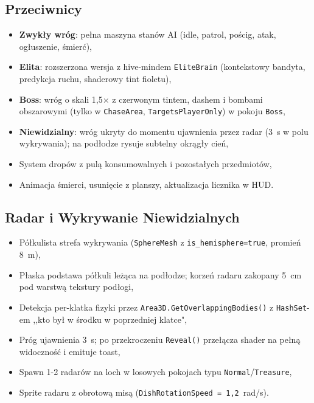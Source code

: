 \subsection{Przeciwnicy}
\begin{itemize}
    \item \textbf{Zwykły wróg}: pełna maszyna stanów AI (idle, patrol, pościg, atak, ogłuszenie, śmierć),
    \item \textbf{Elita}: rozszerzona wersja z hive-mindem \texttt{EliteBrain} (kontekstowy bandyta, predykcja ruchu, shaderowy tint fioletu),
    \item \textbf{Boss}: wróg o skali 1,5$\times$ z czerwonym tintem, dashem i bombami obszarowymi (tylko w \texttt{ChaseArea}, \texttt{TargetsPlayerOnly}) w pokoju \texttt{Boss},
    \item \textbf{Niewidzialny}: wróg ukryty do momentu ujawnienia przez radar (3~s w polu wykrywania); na podłodze rysuje subtelny okrągły cień,
    \item System dropów z pulą konsumowalnych i pozostałych przedmiotów,
    \item Animacja śmierci, usunięcie z planszy, aktualizacja licznika w HUD.
\end{itemize}

\subsection{Radar i Wykrywanie Niewidzialnych}
\begin{itemize}
    \item Półkulista strefa wykrywania (\texttt{SphereMesh} z \texttt{is\_hemisphere=true}, promień 8~m),
    \item Płaska podstawa półkuli leżąca na podłodze; korzeń radaru zakopany 5~cm pod warstwą tekstury podłogi,
    \item Detekcja per-klatka fizyki przez \texttt{Area3D.GetOverlappingBodies()} z \texttt{HashSet}-em ,,kto był w środku w poprzedniej klatce",
    \item Próg ujawnienia 3~s; po przekroczeniu \texttt{Reveal()} przełącza shader na pełną widoczność i emituje toast,
    \item Spawn 1-2 radarów na loch w losowych pokojach typu \texttt{Normal}/\texttt{Treasure},
    \item Sprite radaru z obrotową misą (\texttt{DishRotationSpeed = 1{,}2}~rad/s).
\end{itemize}

